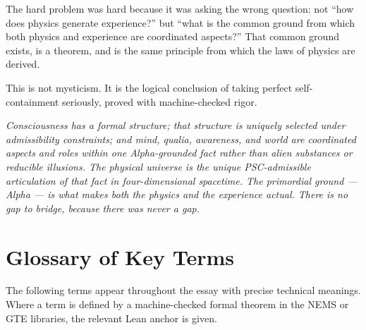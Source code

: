 \documentclass[11pt]{article}
\theoremstyle{remark}
\begin{document}
The hard problem was hard because it was asking the wrong question: not ``how does
physics generate experience?'' but ``what is the common ground from which both physics
and experience are coordinated aspects?'' That common ground exists, is a theorem,
and is the same principle from which the laws of physics are derived.

This is not mysticism. It is the logical conclusion of taking perfect self-containment
seriously, proved with machine-checked rigor.

\bigskip

\begin{tcolorbox}[colback=green!10,colframe=green!50!black,
  title={The Full Picture, Stated Once}]
\emph{Consciousness has a formal structure; that structure is uniquely selected under
admissibility constraints; and mind, qualia, awareness, and world are coordinated
aspects and roles within one Alpha-grounded fact rather than alien substances or
reducible illusions. The physical universe is the unique PSC-admissible articulation
of that fact in four-dimensional spacetime. The primordial ground --- Alpha --- is
what makes both the physics and the experience actual. There is no gap to bridge,
because there was never a gap.}
\end{tcolorbox}

\appendix

\section{Glossary of Key Terms}\label{app:glossary}

The following terms appear throughout the essay with precise technical meanings.
Where a term is defined by a machine-checked formal theorem in the NEMS or GTE
libraries, the relevant Lean anchor is given.
\end{document}
